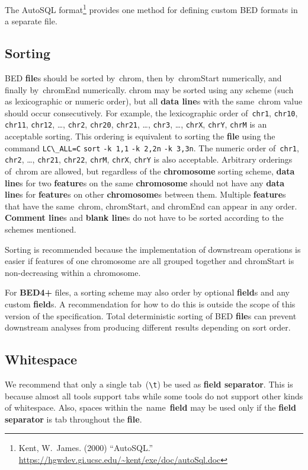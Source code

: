 \documentclass[11pt]{article}
\providecommand*{\Ac}[1]{\ac{#1}} %
\begin{document}
The AutoSQL format\footnote{Kent, W.~James.
  (2000) ``AutoSQL.''
  \url{https://hgwdev.gi.ucsc.edu/~kent/exe/doc/autoSql.doc}} provides one method for defining custom \ac{BED} formats in a separate file.

\subsection{Sorting}
\Ac{BED} \textbf{file}s should be sorted by~\textsf{chrom}, then by~\textsf{chromStart} numerically, and finally by~\textsf{chromEnd} numerically.
\textsf{chrom} may be sorted using any scheme (such as lexicographic or numeric order), but all \textbf{data line}s with the same~\textsf{chrom} value should occur consecutively.
For example, the lexicographic order of~\texttt{chr1}, \texttt{chr10}, \texttt{chr11}, \texttt{chr12}, {\ldots}, \texttt{chr2}, \texttt{chr20}, \texttt{chr21}, {\ldots}, \texttt{chr3}, {\ldots}, \texttt{chrX}, \texttt{chrY}, \texttt{chrM} is an acceptable sorting.
This ordering is equivalent to sorting the \textbf{file} using the command \verb|LC\_ALL=C| \verb|sort| \verb|-k 1,1| \verb|-k 2,2n| \verb|-k 3,3n|.
The numeric order of~\texttt{chr1}, \texttt{chr2}, {\ldots}, \texttt{chr21}, \texttt{chr22}, \texttt{chrM}, \texttt{chrX}, \texttt{chrY} is also acceptable.
Arbitrary orderings of~\textsf{chrom} are allowed, but regardless of the \textbf{chromosome} sorting scheme, \textbf{data line}s for two \textbf{feature}s on the same \textbf{chromosome} should not have any \textbf{data line}s for \textbf{feature}s on other \textbf{chromosome}s between them.
Multiple \textbf{feature}s that have the same~\textsf{chrom}, \textsf{chromStart}, and \textsf{chromEnd} can appear in any order.
\textbf{Comment line}s and \textbf{blank line}s do not have to be sorted according to the schemes mentioned.

Sorting is recommended because the implementation of downstream operations is easier if features of one chromosome are all grouped together and \textsf{chromStart} is non-decreasing within a chromosome.

For \textbf{BED4+} files, a sorting scheme may also order by optional \textbf{field}s and any custom \textbf{field}s.
A recommendation for how to do this is outside the scope of this version of the specification.
Total deterministic sorting of \ac{BED} \textbf{file}s can prevent downstream analyses from producing different results depending on sort order.

\subsection{Whitespace}\label{sec:whitespace}
We recommend that only a single tab~(\texttt{{\textbackslash}t}) be used as \textbf{field separator}.
This is because almost all tools support tabs while some tools do not support other kinds of whitespace.
Also, spaces within the~\textsf{name}~\textbf{field} may be used only if the \textbf{field separator} is tab throughout the \textbf{file}.
\end{document}
